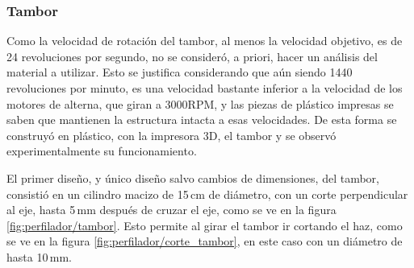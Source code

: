 \subsubsection{Tambor}
Como la velocidad de rotación del tambor, al menos la velocidad objetivo, es de 24 revoluciones por segundo, no se consideró, a priori, hacer un análisis del material a utilizar. Esto se justifica considerando que aún siendo 1440 revoluciones por minuto, es una velocidad bastante inferior a la velocidad de los  motores de alterna, que giran a 3000RPM, y las piezas de plástico impresas se saben que mantienen la estructura intacta a esas velocidades. De esta forma se construyó en plástico, con la impresora 3D, el tambor y se observó experimentalmente su funcionamiento.

El primer diseño, y único diseño salvo cambios de dimensiones, del tambor, consistió en un cilindro macizo de 15$\,$cm de diámetro, con un corte perpendicular al eje, hasta 5$\,$mm después de cruzar el eje, como se ve en la figura \ref{fig:perfilador/tambor}. Esto permite al girar el tambor ir cortando el haz, como se ve en la figura \ref{fig:perfilador/corte_tambor}, en este caso con un diámetro de hasta 10$\,$mm. 


